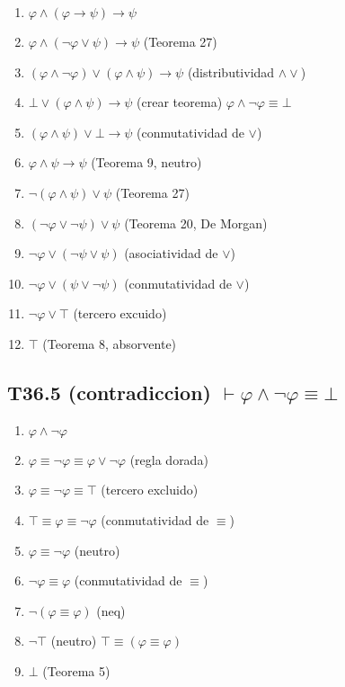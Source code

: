 \begin{enumerate}
    \item $\varphi \land (\varphi \rightarrow \psi) \rightarrow \psi$
    \item $\varphi \land (\neg\varphi \lor \psi) \rightarrow \psi$ \hfill (Teorema 27)
    \item $(\varphi \land \neg\varphi) \lor (\varphi \land \psi) \rightarrow \psi$ \hfill (distributividad $\land\lor$)
    \item $\bot \lor (\varphi \land \psi) \rightarrow \psi$ \hfill (crear teorema) $\varphi \land \neg\varphi \equiv \bot$
    \item $(\varphi \land \psi) \lor \bot \rightarrow \psi$ \hfill (conmutatividad de $\lor$)
    \item $\varphi \land \psi \rightarrow \psi$ \hfill (Teorema 9, neutro)
    \item $\neg(\varphi \land \psi) \lor \psi$ \hfill (Teorema 27)
    \item $(\neg\varphi \lor \neg\psi) \lor \psi$ \hfill (Teorema 20, De Morgan)
    \item $\neg\varphi \lor (\neg\psi \lor \psi)$ \hfill (asociatividad de $\lor$)
    \item $\neg\varphi \lor (\psi \lor \neg\psi)$ \hfill (conmutatividad de $\lor$)
    \item $\neg\varphi \lor \top$ \hfill (tercero excuido)
    \item $\top$ \hfill (Teorema 8, absorvente)
\end{enumerate}

\subsection{T36.5 (contradiccion) $\vdash \varphi \land \neg\varphi \equiv \bot$}

\begin{enumerate}
    \item $\varphi \land \neg\varphi$
    \item $\varphi \equiv \neg\varphi \equiv \varphi \lor \neg\varphi$ \hfill (regla dorada)
    \item $\varphi \equiv \neg\varphi \equiv \top$ \hfill (tercero excluido)
    \item $\top \equiv \varphi \equiv \neg\varphi$ \hfill (conmutatividad de $\equiv$)
    \item $\varphi \equiv \neg\varphi$ \hfill (neutro)
    \item $\neg\varphi \equiv \varphi$ \hfill (conmutatividad de $\equiv$)
    \item $\neg(\varphi \equiv \varphi)$ \hfill (neq)
    \item $\neg\top$ \hfill (neutro) $\top \equiv (\varphi \equiv \varphi)$
    \item $\bot$ \hfill (Teorema 5)
\end{enumerate}

